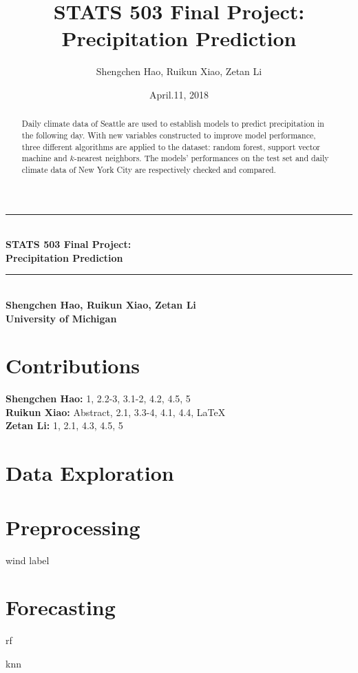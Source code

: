 \documentclass[letterpapaer]{article}
\title{STATS 503 Final Project:\\Precipitation Prediction}
\author{Shengchen Hao, Ruikun Xiao, Zetan Li}
\date{April.11, 2018}
\newcommand{\HRule}{\rule{\textwidth}{0.7mm}}
\begin{document}
\begin{titlepage}
\begin{center}
\HRule \\[0.4cm]
{ \huge \bfseries STATS 503 Final Project:\\ Precipitation Prediction}\\[0.2cm]
\HRule \\[0.6cm]
{ \Large \bfseries Shengchen Hao, Ruikun Xiao, Zetan Li}\\[0.4cm]
{ \large \bfseries University of Michigan}\\[1.0cm]
\end{center}

 \vspace{1cm}

\begin{abstract}
\large

Daily climate data of Seattle are used to establish models to predict precipitation in the following day. With new variables constructed to improve model performance, three different algorithms are applied to the dataset: random forest, support vector machine and $k$-nearest neighbors. The models' performances on the test set and daily climate data of New York City are respectively checked and compared.

\end{abstract}

 \vspace{3cm}

\section*{Contributions}

\large

 \vspace{0.5cm}

\noindent \textbf{Shengchen Hao: }1, 2.2-3, 3.1-2, 4.2, 4.5, 5\\

\noindent \textbf{Ruikun Xiao: }Abstract, 2.1, 3.3-4, 4.1, 4.4, \LaTeX\\

\noindent \textbf{Zetan Li: }1, 2.1, 4.3, 4.5, 5

\end{titlepage}
\tableofcontents

\section{Data Exploration}



\section{Preprocessing}


 {wind}
 {label}
\section{Forecasting}

 {rf}

 {knn}


 \vspace{3cm}

\end{document}
